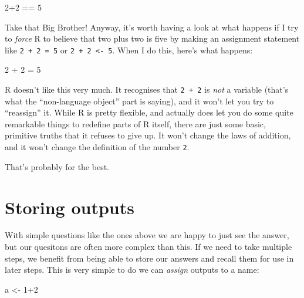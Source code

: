 \documentclass[
]{book}
\newenvironment{Shaded}{\begin{snugshade}}{\end{snugshade}}
\newcommand{\DecValTok}[1]{\textcolor[rgb]{0.00,0.00,0.81}{#1}}
\newcommand{\NormalTok}[1]{#1}
\newcommand{\OtherTok}[1]{\textcolor[rgb]{0.56,0.35,0.01}{#1}}
\newcommand{\SpecialCharTok}[1]{\textcolor[rgb]{0.00,0.00,0.00}{#1}}
\begin{document}
\begin{Shaded}
\begin{Highlighting}[]
\DecValTok{2}\SpecialCharTok{+}\DecValTok{2} \SpecialCharTok{==} \DecValTok{5}
\end{Highlighting}
\end{Shaded}

Take that Big Brother! Anyway, it's worth having a look at what happens if I try to \emph{force} R to believe that two plus two is five by making an assignment statement like \texttt{2\ +\ 2\ =\ 5} or \texttt{2\ +\ 2\ \textless{}-\ 5}. When I do this, here's what happens:

\begin{Shaded}
\begin{Highlighting}[]
\DecValTok{2} \SpecialCharTok{+} \DecValTok{2} \OtherTok{=} \DecValTok{5}
\end{Highlighting}
\end{Shaded}

R doesn't like this very much. It recognises that \texttt{2\ +\ 2} is \emph{not} a variable (that's what the ``non-language object'' part is saying), and it won't let you try to ``reassign'' it. While R is pretty flexible, and actually does let you do some quite remarkable things to redefine parts of R itself, there are just some basic, primitive truths that it refuses to give up. It won't change the laws of addition, and it won't change the definition of the number \texttt{2}.

That's probably for the best.

\hypertarget{storing-outputs}{%
\section{Storing outputs}\label{storing-outputs}}

With simple questions like the ones above we are happy to just see the answer, but our quesitons are often more complex than this. If we need to take multiple steps, we benefit from being able to store our answers and recall them for use in later steps. This is very simple to do we can \emph{assign} outputs to a name:

\begin{Shaded}
\begin{Highlighting}[]
\NormalTok{a }\OtherTok{\textless{}{-}} \DecValTok{1}\SpecialCharTok{+}\DecValTok{2}
\end{Highlighting}
\end{Shaded}
\end{document}
